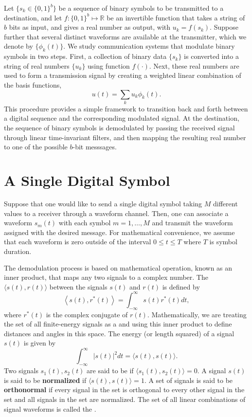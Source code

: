 Let $\{ s_k \in \{ 0, 1 \}^b \}$ be a sequence of binary symbols to be transmitted to a destination, and let $f : \{ 0, 1 \}^b \mapsto \mathbb{R}$ be an invertible function that takes a string of $b$ bits as input, and gives a real number as output, with $u_k = f(s_k)$.
Suppose further that several distinct waveforms are available at the transmitter, which we denote by $\{ \phi_k (t) \}$.
We study communication systems that modulate binary symbols in two steps.
First, a collection of binary data $\{ s_k \}$ is converted into a string of real numbers $\{ u_k \}$ using function $f(\cdot)$.
Next, these real numbers are used to form a transmission signal by creating a weighted linear combination of the basis functions,
\begin{equation*}
u(t) = \sum_k u_k \phi_k(t) .
\end{equation*}
This procedure provides a simple framework to transition back and forth between a digital sequence and the corresponding modulated signal.
At the destination, the sequence of binary symbols is demodulated by passing the received signal through linear time-invariant filters, and then mapping the resulting real number to one of the possible $b$-bit messsages.
\fi

\section{A Single Digital Symbol}

Suppose that one would like to send a single digital symbol taking $M$ different values to a receiver through a waveform channel.
Then, one can associate a waveform $s_m (t)$ with each symbol $m=1,\ldots,M$ and transmit the waveform assigned with the desired message.
For mathematical convenience, we assume that each waveform is zero outside of the interval $0\leq t\leq T$ where $T$ is symbol duration.

The demodulation process is based on mathematical operation, known as an inner product, that maps any two signals to a complex number.
The  $\langle s(t) , r(t) \rangle$ between the signals $s(t)$ and $r(t)$ is defined by
\begin{equation*}
\left\langle s (t), r^* (t) \right\rangle
= \int_{-\infty}^{\infty} s(t) r^* (t) dt,
\end{equation*}
where $r^* (t)$ is the complex conjugate of $r(t)$.
Mathematically, we are treating the set of all finite-energy signals as a  and using this inner product to define distances and angles in this space.
The energy (or length squared) of a signal $s(t)$ is given by
\[ \int_{-\infty}^{\infty} \left| s(t) \right|^2 dt = \langle s(t),s(t) \rangle. \]
Two signals $s_1 (t),s_2 (t)$ are said to be  if $\langle s_1(t),s_2 (t)\rangle = 0$.
A signal $s(t)$ is said to be \textbf{normalized} if $\langle s(t),s(t) \rangle = 1$.
A set of signals is said to be \textbf{orthonormal} if every signal in the set is orthogonal to every other signal in the set and all signals in the set are normalized.
The set of all linear combinations of signal waveforms is called the .


